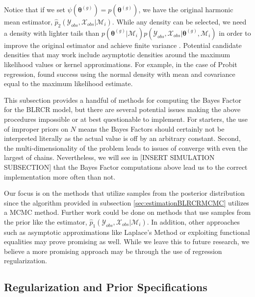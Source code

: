 \documentclass[
  12pt,
]{article}
\begin{document}
Notice that if we set
\(\psi(\boldsymbol{\theta}^{(g)}) = p(\boldsymbol{\theta}^{(g)})\), we
have the original harmonic mean estimator,
\(\hat{p}_2(\mathcal{Y}_{obs},\mathcal{X}_{obs}|\mathcal{M}_i)\). While
any density can be selected, we need a density with lighter tails than
\(p(\boldsymbol{\theta}^{(g)}|\mathcal{M}_i)p(\mathcal{Y}_{obs},\mathcal{X}_{obs}|\boldsymbol{\theta}^{(g)},\mathcal{M}_i)\)
in order to improve the original estimator and achieve finite variance
\citep{robert_computational_2009}. Potential candidate densities that
may work include asymptotic densities around the maximum likelihood
values or kernel approximations. For example, in the case of Probit
regression, \cite{marin_importance_2018} found success using the normal
density with mean and covariance equal to the maximum likelihood
estimate.

This subsection provides a handful of methods for computing the Bayes
Factor for the BLRCR model, but there are several potential issues
making the above procedures impossible or at best questionable to
implement. For starters, the use of improper priors on \(N\) means the
Bayes Factors should certainly not be interpreted literally as the
actual value is off by an arbitrary constant. Second, the
multi-dimensionality of the problem leads to issues of converge with
even the largest of chains. Nevertheless, we will see in {[}INSERT
SIMULATION SUBSECTION{]} that the Bayes Factor computations above lead
us to the correct implementation more often than not.

Our focus is on the methods that utilize samples from the posterior
distribution since the algorithm provided in subsection
\ref{sec:estimationBLRCRMCMC} utilizes a MCMC method. Further work could
be done on methods that use samples from the prior like the estimator,
\(\hat{p}_1(\mathcal{Y}_{obs},\mathcal{X}_{obs}|\mathcal{M}_i)\). In
addition, other approaches such as asymptotic approximations like
Laplace's Method or exploiting functional equalities
\cite{chib_marginal_1995} may prove promising as well. While we leave
this to future research, we believe a more promising approach may be
through the use of regression regularization.

\subsection{Regularization and Prior Specifications}
\end{document}
